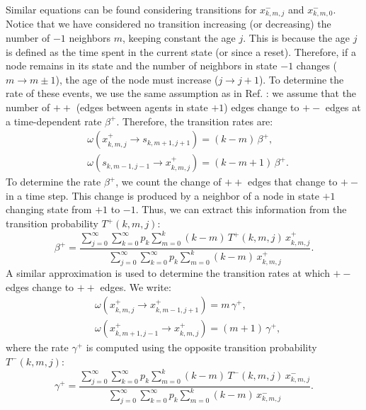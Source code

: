 Similar equations can be found considering transitions for $x^{-}_{k,m,j}$ and $x^{-}_{k,m,0}$. Notice that we have considered no transition increasing (or decreasing) the number of $-1$ neighbors $m$, keeping constant the age $j$. This is because the age $j$ is defined as the time spent in the current state (or since a reset). Therefore, if a node remains in its state and the number of neighbors in state $-1$ changes ($m \to m \pm 1$), the age of the node must increase ($j \to j + 1$). To determine the rate of these events, we use the same assumption as in Ref. \cite{gleeson-2013}: we assume that the number of $++$ (edges between agents in state $+1$) edges change to $+-$ edges at a time-dependent rate $\beta^{+}$. Therefore, the transition rates are:
    \begin{align} \label{rate_beta_s}
    &  \omega (x^{+}_{k,m,j} \to s_{k,m+1,j+1}) = (k - m) \, \beta^{+}, \nonumber \\
    & \omega (s_{k,m-1,j-1} \to x^{+}_{k,m,j}) = (k - m + 1)\, \beta^{+} . 
    \end{align}
To determine the rate $\beta^{+}$, we count the change of $++$ edges that change to $+-$ in a time step. This change is produced by a neighbor of a node in state $+1$ changing state from $+1$ to $-1$. Thus, we can extract this information from the transition probability $T^{+}(k,m,j)$:
\begin{equation}
        \label{beta_s}
        \beta^{+} = \frac{\sum_{j=0}^{\infty} \sum_{k=0}^{\infty} p_k \sum_{m = 0}^{k} (k - m)\, T^{+} (k,m,j) \, x^{+}_{k,m,j}}{\sum_{j=0}^{\infty} \sum_{k=0}^{\infty} p_k \sum_{m = 0}^{k} (k - m) \, x^{+}_{k,m,j}}.
\end{equation}
A similar approximation is used to determine the transition rates at which $+-$ edges change to $++$ edges. We write:
\begin{align} \label{rate_gamma_s}
    &  \omega (x^{+}_{k,m,j} \to x^{+}_{k,m-1,j+1}) = m\, \gamma^{+}, \nonumber \\
    & \omega (x^{+}_{k,m+1,j-1} \to x^{+}_{k,m,j}) = (m + 1)\, \gamma^{+} ,
\end{align}
where the rate $\gamma^{+}$ is computed using the opposite transition probability $T^{-}(k,m,j)$:
\begin{equation}
        \label{gamma_s}
        \gamma^{+} = \frac{\sum_{j=0}^{\infty} \sum_{k=0}^{\infty} p_k \sum_{m = 0}^{k} (k - m)\, T^{-} (k,m,j) \, x^{-}_{k,m,j}}{\sum_{j=0}^{\infty} \sum_{k=0}^{\infty} p_k \sum_{m = 0}^{k} (k - m)\,  x^{-}_{k,m,j}}.
\end{equation}
    
